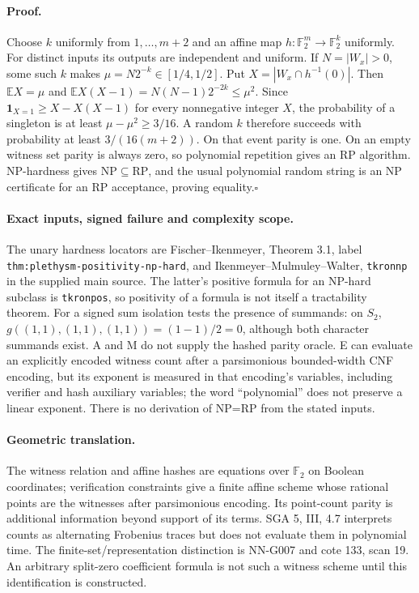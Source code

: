 \paragraph{Proof.}
Choose $k$ uniformly from $1,\ldots,m+2$ and an affine map
$h:\mathbb F_2^m\to\mathbb F_2^k$ uniformly. For distinct
inputs its outputs are independent and uniform. If
$N=|W_x|>0$, some such $k$ makes
$\mu=N2^{-k}\in[1/4,1/2]$. Put
$X=|W_x\cap h^{-1}(0)|$. Then
$\mathbb E X=\mu$ and
$\mathbb E X(X-1)=N(N-1)2^{-2k}\le\mu^2$.
Since $\mathbf1_{X=1}\ge X-X(X-1)$ for every nonnegative
integer $X$, the probability of a singleton is at least
$\mu-\mu^2\ge3/16$. A random $k$ therefore succeeds with
probability at least $3/(16(m+2))$. On that event parity is
one. On an empty witness set parity is always zero, so
polynomial repetition gives an RP algorithm. NP-hardness
gives $\mathrm{NP}\subseteq\mathrm{RP}$, and the usual
polynomial random string is an NP certificate for an RP
acceptance, proving equality.\hfill$\square$

\paragraph{Exact inputs, signed failure and complexity scope.}
The unary hardness locators are Fischer--Ikenmeyer,
Theorem 3.1, label \texttt{thm:plethysm-positivity-np-hard},
and Ikenmeyer--Mulmuley--Walter, \texttt{tkronnp} in the
supplied main source. The latter's positive formula for
an NP-hard subclass is \texttt{tkronpos}, so positivity of
a formula is not itself a tractability theorem.
For a signed sum isolation tests the presence of summands:
on $S_2$, $g((1,1),(1,1),(1,1))=(1-1)/2=0$, although
both character summands exist. A and M do not supply the
hashed parity oracle. E can evaluate an explicitly encoded
witness count after a parsimonious bounded-width CNF
encoding, but its exponent is measured in that encoding's
variables, including verifier and hash auxiliary variables;
the word ``polynomial'' does not preserve a linear exponent.
There is no derivation of NP=RP from the stated inputs.

\paragraph{Geometric translation.}
The witness relation and affine hashes are equations over
$\mathbb F_2$ on Boolean coordinates; verification constraints
give a finite affine scheme whose rational points are the
witnesses after parsimonious encoding. Its point-count
parity is additional information beyond support of its
terms. SGA 5, III, 4.7 interprets counts as alternating
Frobenius traces but does not evaluate them in polynomial
time. The finite-set/representation distinction is
NN-G007 and cote 133, scan 19. An arbitrary split-zero
coefficient formula is not such a witness scheme until
this identification is constructed.

